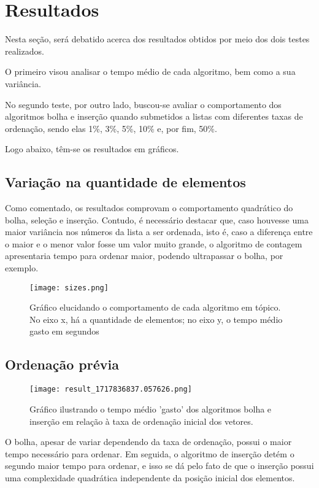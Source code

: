 \section{Resultados}
Nesta seção, será debatido acerca dos resultados obtidos por meio dos dois testes realizados. 

O primeiro visou analisar o tempo médio de cada algoritmo, bem como a sua variância. 

No segundo teste, por outro lado, buscou-se avaliar o comportamento dos algoritmos bolha e inserção quando submetidos a listas com diferentes taxas de ordenação, sendo elas 1\%, 3\%, 5\%, 10\% e, por fim, 50\%. 

Logo abaixo, têm-se os resultados em gráficos.

\subsection{Variação na quantidade de elementos}
Como comentado, os resultados comprovam o comportamento quadrático do bolha, seleção e inserção. 
Contudo, é necessário destacar que, caso houvesse uma maior variância nos números da lista a ser ordenada, isto é, caso a diferença entre o maior e o menor valor fosse um valor muito grande, o algoritmo de contagem apresentaria tempo para ordenar maior, podendo ultrapassar o bolha, por exemplo.

\begin{figure}[h]
    \texttt{[image: sizes.png]}
    \caption{Gráfico elucidando o comportamento de cada algoritmo em tópico. No eixo x, há a quantidade de elementos; no eixo y, o tempo médio gasto em segundos}
    \end{figure}
    \newpage
    \subsection{Ordenação prévia}
    \begin{figure}[h]
        \texttt{[image: result\_1717836837.057626.png]}
        \caption{Gráfico ilustrando o tempo médio 'gasto' dos algoritmos bolha e inserção em relação à taxa de ordenação inicial dos vetores.}
    \end{figure}

O bolha, apesar de variar dependendo da taxa de ordenação, possui o maior tempo necessário para ordenar. Em seguida, o algoritmo de inserção detém o segundo maior tempo para ordenar, e isso se dá pelo fato de que o inserção possui uma complexidade quadrática independente da posição inicial dos elementos. 

